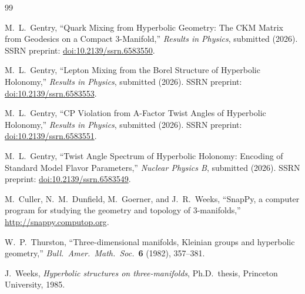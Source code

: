 \documentclass[12pt]{article}
\theoremstyle{definition}
\begin{document}
\begin{thebibliography}{99}

  M.~L.~Gentry,
  ``Quark Mixing from Hyperbolic Geometry: The CKM Matrix from Geodesics
  on a Compact 3-Manifold,''
  \textit{Results in Physics}, submitted (2026).
  SSRN preprint: \href{https://doi.org/10.2139/ssrn.6583550}
  {doi:10.2139/ssrn.6583550}.

  M.~L.~Gentry,
  ``Lepton Mixing from the Borel Structure of Hyperbolic Holonomy,''
  \textit{Results in Physics}, submitted (2026).
  SSRN preprint: \href{https://doi.org/10.2139/ssrn.6583553}
  {doi:10.2139/ssrn.6583553}.

  M.~L.~Gentry,
  ``CP Violation from A-Factor Twist Angles of Hyperbolic Holonomy,''
  \textit{Results in Physics}, submitted (2026).
  SSRN preprint: \href{https://doi.org/10.2139/ssrn.6583551}
  {doi:10.2139/ssrn.6583551}.

  M.~L.~Gentry,
  ``Twist Angle Spectrum of Hyperbolic Holonomy: Encoding of Standard
  Model Flavor Parameters,''
  \textit{Nuclear Physics B}, submitted (2026).
  SSRN preprint: \href{https://doi.org/10.2139/ssrn.6583549}
  {doi:10.2139/ssrn.6583549}.

  M.~Culler, N.~M.~Dunfield, M.~Goerner, and J.~R.~Weeks,
  ``SnapPy, a computer program for studying the geometry and topology
  of 3-manifolds,''
  \url{http://snappy.computop.org}.

  W.~P.~Thurston,
  ``Three-dimensional manifolds, Kleinian groups and hyperbolic
  geometry,''
  \textit{Bull.\ Amer.\ Math.\ Soc.}\ \textbf{6} (1982), 357--381.

  J.~Weeks,
  \textit{Hyperbolic structures on three-manifolds},
  Ph.D.\ thesis, Princeton University, 1985.

\end{thebibliography}
\end{document}
